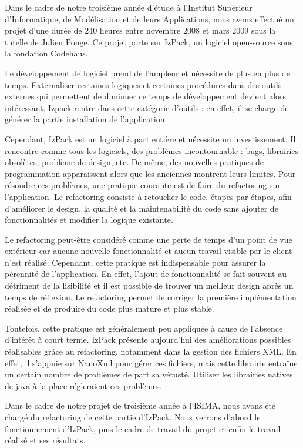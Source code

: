 Dans le cadre de notre troisième année d'étude à l'Institut Supérieur d'Informatique, de Modélisation et de leurs Applications, nous avons effectué un projet d'une durée de 240 heures entre novembre 2008 et mars 2009 sous la tutelle de Julien Ponge.
Ce projet porte sur IzPack, un logiciel open-source sous la fondation Codehaus.

Le développement de logiciel prend de l'ampleur et nécessite de plus en plus de temps.
Externaliser certaines logiques et certaines procédures dans des outils externes qui permettent de diminuer ce temps de développement devient alors intéressant.
Izpack rentre dans cette catégorie d'outils : en effet, il se charge de générer la partie installation de l'application.

Cependant, IzPack est un logiciel à part entière et nécessite un investissement.
Il rencontre comme tous les logiciels, des problèmes incontournable : bugs, librairies obsolètes, problème de design, etc.
De même, des nouvelles pratiques de programmation apparaissent alors que les anciennes montrent leurs limites.
Pour résoudre ces problèmes, une pratique courante est de faire du refactoring sur l'application.
Le refactoring consiste à retoucher le code, étapes par étapes, afin d'améliorer le design, la qualité et la maintenabilité du code sans ajouter de fonctionnalités et modifier la logique existante.

Le refactoring peut-être considéré comme une perte de temps d'un point de vue extérieur car aucune nouvelle fonctionnalité et aucun travail visible par le client n'est réalisé.
Cependant, cette pratique est indispensable pour assurer la pérennité de l'application.
En effet, l'ajout de fonctionnalité se fait souvent au détriment de la lisibilité et il est possible de trouver un meilleur design après un temps de réflexion.
Le refactoring permet de corriger la première implémentation réalisée et de produire du code plus mature et plus stable.

Toutefois, cette pratique est généralement peu appliquée à cause de l'absence d'intérêt à court terme.
IzPack présente aujourd'hui des améliorations possibles réalisables grâce au refactoring, notamment dans la gestion des fichiers XML.
En effet, il s'appuie sur NanoXml pour gérer ces fichiers, mais cette librairie entraîne un certain nombre de problèmes de part sa vétusté.
Utiliser les librairies natives de java à la place régleraient ces problèmes.

Dans le cadre de notre projet de troisième année à l'ISIMA, nous avons été chargé du refactoring de cette partie d'IzPack.
Nous verrons d'abord le fonctionnement d'IzPack, puis le cadre de travail du projet et enfin le travail réalisé et ses résultats.